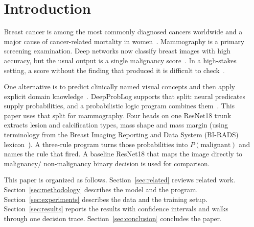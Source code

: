 \section{Introduction}
\label{sec:introduction}

Breast cancer is among the most commonly diagnosed cancers worldwide and a major cause of cancer-related mortality in women~\cite{sung2021global}. Mammography is a primary screening examination. Deep networks now classify breast images with high accuracy, but the usual output is a single malignancy score~\cite{litjens2017survey,balkenende2022application}. In a high-stakes setting, a score without the finding that produced it is difficult to check~\cite{rudin2019stop,vandervelden2022xai}.

One alternative is to predict clinically named visual concepts and then apply explicit domain knowledge~\cite{koh2020concept}. DeepProbLog supports that split: neural predicates supply probabilities, and a probabilistic logic program combines them~\cite{manhaeve2021neural}. This paper uses that split for mammography. Four heads on one ResNet18 trunk extracts lesion and calcification types, mass shape and mass margin (using terminology from the Breast Imaging Reporting and Data System (BI-RADS) lexicon~\cite{acr2013birads}). A three-rule program turns those probabilities into $P(\mathrm{malignant})$ and names the rule that fired. A baseline ResNet18 that maps the image directly to malignancy/ non-malignancy binary decision is used for comparison.

This paper is organized as follows. Section~\ref{sec:related} reviews related work. Section~\ref{sec:methodology} describes the model and the program. Section~\ref{sec:experiments} describes the data and the training setup. Section~\ref{sec:results} reports the results with confidence intervals and walks through one decision trace. Section~\ref{sec:conclusion} concludes the paper.

